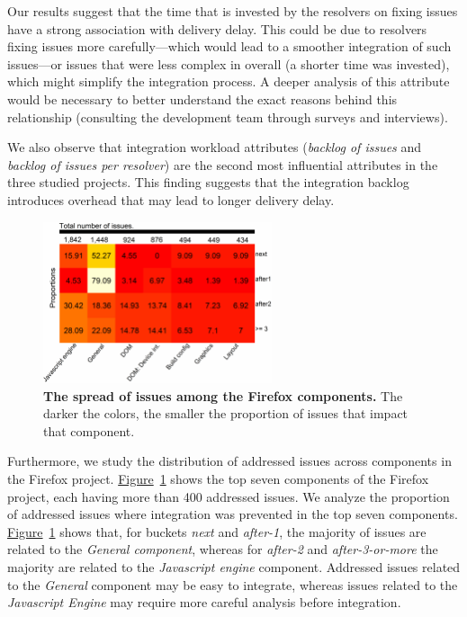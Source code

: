 Our results suggest that the time that is invested by the resolvers on fixing
issues have a strong association with delivery delay. This could be due to
resolvers fixing issues more carefully---which would lead to a smoother
integration of such issues---or issues that were less complex in overall (\eg a
shorter time was invested), which might simplify the integration process. A deeper
analysis of this attribute would be necessary to better understand the exact
reasons behind this relationship (\eg consulting the development team through
surveys and interviews). 

We also observe that integration workload attributes (\ie \textit{backlog of
issues} and \textit{backlog of issues per resolver}) are the second most
influential attributes in the three studied projects. This finding suggests that
the integration backlog introduces overhead that may lead to longer delivery
delay.

\begin{figure}[!t]
	\centering
	\includegraphics[width=0.60\textwidth,keepaspectratio]
	{chapters/chapter4/figures/firefox/RQ3_component_hm.pdf}
	\caption{\textbf{The spread of issues among the Firefox components.} The
		darker the colors, the smaller the proportion of issues that
	impact that component.}
	\label{ch4:fig:componentHeatmap}
\end{figure}

Furthermore, we study the distribution of addressed issues across components in the
Firefox project.
\hyperref[ch4:fig:componentHeatmap]{Figure}~\ref{ch4:fig:componentHeatmap} shows the top
seven components of the Firefox project, each having more than 400 addressed issues.
We analyze the proportion of addressed issues where integration was prevented in the
top seven components.
\hyperref[ch4:fig:componentHeatmap]{Figure}~\ref{ch4:fig:componentHeatmap} shows that,
for buckets \textit{next} and \textit{after-1}, the majority of issues are
related to the \textit{General component}, whereas for \textit{after-2} and
\textit{after-3-or-more} the majority are related to the \textit{Javascript
engine} component. Addressed issues related to the \textit{General} component
may be easy to integrate, whereas issues related to the \textit{Javascript
Engine} may require more careful analysis before integration.  \\


